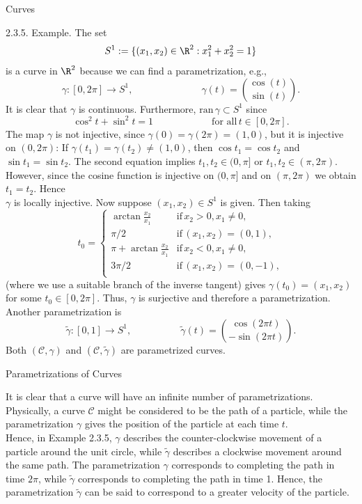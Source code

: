 \documentclass[smaller,hyperref={CJKbookmarks=true}]{beamer}
\begin{document}
\begin{frame}{Curves}
\begin{spacing}{0.9}
\alert{2.3.5. Example.} The set
\[S^1:=\{(x_1,x_2)\in\R^2:x_1^2+x_2^2=1\}\]
is a curve in $\R^2$ because we can find a parametrization, e.g.,
\[\gamma:[0,2\pi]\to S^1,\qquad\qquad\qquad\quad\gamma(t)=\binom{\cos(t)}{\sin(t)}.\]
It is clear that $\gamma$ is continuous. Furthermore, $\text{ran}\,\gamma\subset S^1$ since
\[\cos^2 t+\sin^2 t=1\qquad\qquad\qquad\text{for all}\,t\in[0,2\pi].\]
The map $\gamma$ is not injective, since $\gamma(0)=\gamma(2\pi)=(1,0)$, but it is injective on $(0,2\pi)$: If $\gamma(t_1)=\gamma(t_2)\neq(1,0)$, then $\cos t_1=\cos t_2$ and $\sin t_1=\sin t_2$. The second equation implies $t_1,t_2\in(0,\pi]$ or $t_1,t_2\in(\pi,2\pi)$. However, since the cosine function is injective on $(0,\pi]$ and on $(\pi,2\pi)$ we obtain $t_1=t_2$. Hence\\ $\gamma$ is locally injective.
\newpage
Now suppose $(x_1,x_2)\in S^1$ is given. Then taking
\setcounter{equation}{0}
\begin{equation}\label{2.3.1}
  t_0=\left\{\begin{array}{ll}
                 \arctan\frac{x_2}{x_1} & \text{if}\,x_2>0,x_1\neq0,\\[4pt]
                 \pi/2 & \text{if}\,(x_1,x_2)=(0,1), \\[4pt]
                 \pi+\arctan\frac{x_2}{x_1} & \text{if}\,x_2<0,x_1\neq0, \\[4pt]
                 3\pi/2 & \text{if}\,(x_1,x_2)=(0,-1), \\[4pt]
               \end{array}\right.
\end{equation}
(where we use a suitable branch of the inverse tangent) gives $\gamma(t_0)=(x_1,x_2)$ for some $t_0\in[0,2\pi]$. Thus, $\gamma$ is surjective and therefore a parametrization.\\[6pt]
Another parametrization is
\[\widetilde{\gamma}:[0,1]\to S^1,\qquad\qquad\quad\widetilde{\gamma}(t)=\binom{\cos(2\pi t)}{-\sin(2\pi t)}.\]
Both $(\mathcal{C},\gamma)$ and $(\mathcal{C},\widetilde{\gamma})$ are parametrized curves.
\end{spacing}
\end{frame}
\newpage
\begin{frame}[c]{Parametrizations of Curves}
\begin{spacing}{1}
It is clear that a curve will have an infinite number of parametrizations.
Physically, a curve $\mathcal{C}$ might be considered to be the path of a particle, while
the parametrization $\gamma$ gives the position of the particle at each time $t$.\\[9pt]
Hence, in Example 2.3.5, $\gamma$ describes the counter-clockwise movement of a particle around the unit circle, while $\widetilde{\gamma}$ describes a clockwise movement around the same path. The parametrization $\gamma$ corresponds to completing the path in time $2\pi$, while $\widetilde{\gamma}$ corresponds to completing the path in time 1. Hence, the parametrization $\widetilde{\gamma}$ can be said to correspond to a greater velocity of the particle.
\end{spacing}
\end{frame}
\end{document}
